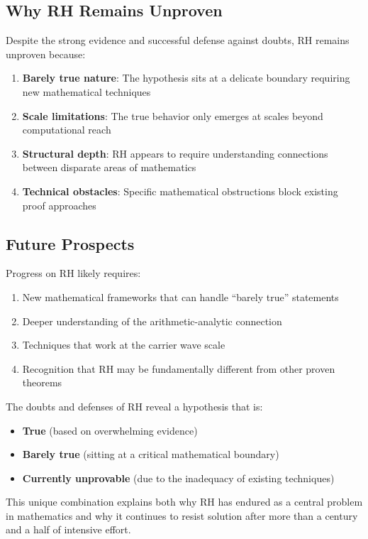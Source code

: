 \subsection{Why RH Remains Unproven}
\label{subsec:why_unproven}

Despite the strong evidence and successful defense against doubts, RH remains unproven because:

\begin{enumerate}
\item \textbf{Barely true nature}: The hypothesis sits at a delicate boundary requiring new mathematical techniques
\item \textbf{Scale limitations}: The true behavior only emerges at scales beyond computational reach
\item \textbf{Structural depth}: RH appears to require understanding connections between disparate areas of mathematics
\item \textbf{Technical obstacles}: Specific mathematical obstructions block existing proof approaches
\end{enumerate}

\subsection{Future Prospects}
\label{subsec:future_prospects}

\begin{conjecture}
Progress on RH likely requires:
\begin{enumerate}
\item New mathematical frameworks that can handle ``barely true'' statements
\item Deeper understanding of the arithmetic-analytic connection
\item Techniques that work at the carrier wave scale
\item Recognition that RH may be fundamentally different from other proven theorems
\end{enumerate}
\end{conjecture}

\begin{remark}
The doubts and defenses of RH reveal a hypothesis that is:
\begin{itemize}
\item \textbf{True} (based on overwhelming evidence)
\item \textbf{Barely true} (sitting at a critical mathematical boundary)
\item \textbf{Currently unprovable} (due to the inadequacy of existing techniques)
\end{itemize}

This unique combination explains both why RH has endured as a central problem in mathematics and why it continues to resist solution after more than a century and a half of intensive effort.
\end{remark}

